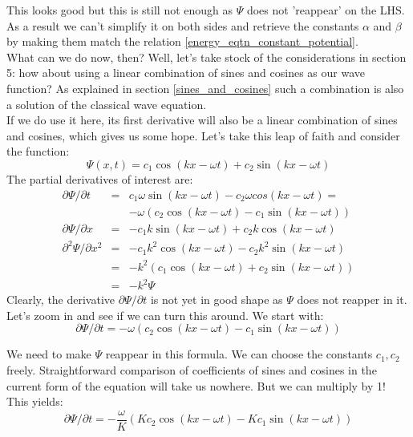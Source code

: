 \documentclass[12pt]{article}
\begin{document}
This looks good but this is still not enough as $\Psi$ does not 'reappear' on the LHS. As a result we can't simplify it on both sides and retrieve the constants $\alpha$ and $\beta$ by making them match the relation \eqref{energy_eqtn_constant_potential}.
\\ \indent What can we do now, then? Well, let's take stock of the considerations in section 5: how about using a linear combination of sines and cosines as our wave function? As explained in 
section \ref{sines_and_cosines} such a combination is also a solution of the classical wave equation. 
\\ \indent If we do use it here, its first derivative will also be a linear combination of 
sines and cosines, which gives us some hope. Let's take this leap of faith and consider the function:
\begin{equation*}
\Psi(x, t) = c_1 \cos (kx - \omega t) +
c_2 \sin(kx - \omega t)
\end{equation*}
The partial derivatives of interest are:
\begin{eqnarray}
\nonumber
\partial \Psi / \partial t &=& 
c_1 \omega \sin(kx - \omega t) -
c_2 \omega cos(kx - \omega t) = \\ 
\nonumber
&& - \omega \left(
c_2 \cos(kx - \omega t) - c_1 \sin(kx - \omega t)
\right) \\
\nonumber
\partial \Psi / \partial x &=& - c_1 k \sin (kx - \omega t) + 
c_2 k \cos (kx - \omega t) \\ 
\nonumber
\partial^2 \Psi / \partial x^2 &=& - c_1 k^2 \cos (kx - \omega t) - 
c_2 k^2 \sin (kx - \omega t) \\ 
\nonumber
&=& - k^2 \left(
 c_1 \cos (kx - \omega t) +
c_2 \sin (kx - \omega t)
\right) \\
\nonumber
&=& -k^2 \Psi
\end{eqnarray}
Clearly, the derivative $\partial \Psi / \partial t$ is not yet in good shape 
as $\Psi$ does not reapper in it. Let's zoom in and see if we can turn this around. We start with:
\begin{equation*}
\partial \Psi / \partial t = -\omega \left(
c_2 \cos(kx - \omega t) - c_1 \sin(kx - \omega t)
\right)
\end{equation*}

We need to make $\Psi$ reappear in this formula. We can choose the constants 
$c_1, c_2$ freely. Straightforward comparison of coefficients of sines and cosines in the current form of the equation will take us nowhere. But we can 
multiply by 1! This yields:
\begin{equation*}
\partial \Psi / \partial t = - \frac{\omega}{K} \left(
Kc_2 \cos(kx - \omega t) - Kc_1 \sin(kx - \omega t)
\right)
\end{equation*}
\end{document}
